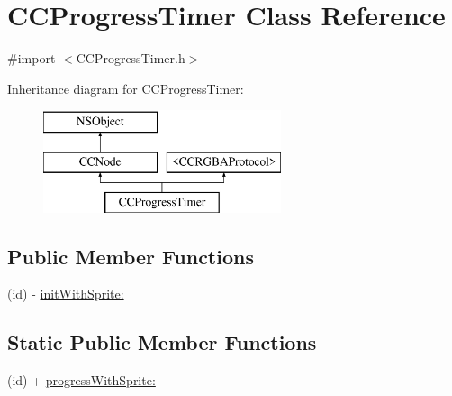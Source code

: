 \hypertarget{interface_c_c_progress_timer}{\section{C\-C\-Progress\-Timer Class Reference}
\label{interface_c_c_progress_timer}
}


{\ttfamily \#import $<$C\-C\-Progress\-Timer.\-h$>$}

Inheritance diagram for C\-C\-Progress\-Timer\-:\begin{figure}[H]
\begin{center}
\leavevmode
\includegraphics[height=3.000000cm]{interface_c_c_progress_timer}
\end{center}
\end{figure}
\subsection*{Public Member Functions}
\begin{DoxyCompactItemize}
\item 
(id) -\/ \hyperlink{interface_c_c_progress_timer_a0f80442a5eebaf8801e1199de461f1a0}{init\-With\-Sprite\-:}
\end{DoxyCompactItemize}
\subsection*{Static Public Member Functions}
\begin{DoxyCompactItemize}
\item 
(id) + \hyperlink{interface_c_c_progress_timer_a7be0e24b3783be61c201b3e712647f6e}{progress\-With\-Sprite\-:}
\end{DoxyCompactItemize}
